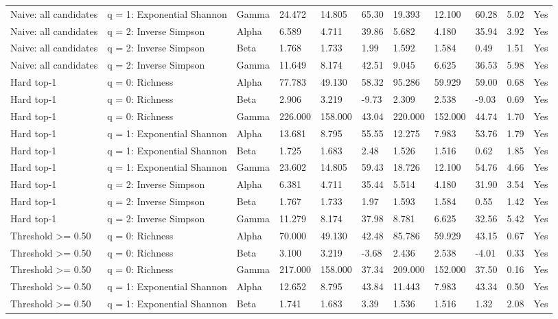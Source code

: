 \begin{landscape}
\begin{longtable}{L{3.0cm}L{2.4cm}L{1.5cm}*{6}{C{1.25cm}}C{1.65cm}C{1.35cm}}
Naive: all candidates & q = 1: Exponential Shannon & Gamma & 24.472 & 14.805 & 65.30 & 19.393 & 12.100 & 60.28 & 5.02 & Yes \\
Naive: all candidates & q = 2: Inverse Simpson & Alpha & 6.589 & 4.711 & 39.86 & 5.682 & 4.180 & 35.94 & 3.92 & Yes \\
Naive: all candidates & q = 2: Inverse Simpson & Beta & 1.768 & 1.733 & 1.99 & 1.592 & 1.584 & 0.49 & 1.51 & Yes \\
Naive: all candidates & q = 2: Inverse Simpson & Gamma & 11.649 & 8.174 & 42.51 & 9.045 & 6.625 & 36.53 & 5.98 & Yes \\
Hard top-1 & q = 0: Richness & Alpha & 77.783 & 49.130 & 58.32 & 95.286 & 59.929 & 59.00 & 0.68 & Yes \\
Hard top-1 & q = 0: Richness & Beta & 2.906 & 3.219 & -9.73 & 2.309 & 2.538 & -9.03 & 0.69 & Yes \\
Hard top-1 & q = 0: Richness & Gamma & 226.000 & 158.000 & 43.04 & 220.000 & 152.000 & 44.74 & 1.70 & Yes \\
Hard top-1 & q = 1: Exponential Shannon & Alpha & 13.681 & 8.795 & 55.55 & 12.275 & 7.983 & 53.76 & 1.79 & Yes \\
Hard top-1 & q = 1: Exponential Shannon & Beta & 1.725 & 1.683 & 2.48 & 1.526 & 1.516 & 0.62 & 1.85 & Yes \\
Hard top-1 & q = 1: Exponential Shannon & Gamma & 23.602 & 14.805 & 59.43 & 18.726 & 12.100 & 54.76 & 4.66 & Yes \\
Hard top-1 & q = 2: Inverse Simpson & Alpha & 6.381 & 4.711 & 35.44 & 5.514 & 4.180 & 31.90 & 3.54 & Yes \\
Hard top-1 & q = 2: Inverse Simpson & Beta & 1.767 & 1.733 & 1.97 & 1.593 & 1.584 & 0.55 & 1.42 & Yes \\
Hard top-1 & q = 2: Inverse Simpson & Gamma & 11.279 & 8.174 & 37.98 & 8.781 & 6.625 & 32.56 & 5.42 & Yes \\
Threshold >= 0.50 & q = 0: Richness & Alpha & 70.000 & 49.130 & 42.48 & 85.786 & 59.929 & 43.15 & 0.67 & Yes \\
Threshold >= 0.50 & q = 0: Richness & Beta & 3.100 & 3.219 & -3.68 & 2.436 & 2.538 & -4.01 & 0.33 & Yes \\
Threshold >= 0.50 & q = 0: Richness & Gamma & 217.000 & 158.000 & 37.34 & 209.000 & 152.000 & 37.50 & 0.16 & Yes \\
Threshold >= 0.50 & q = 1: Exponential Shannon & Alpha & 12.652 & 8.795 & 43.84 & 11.443 & 7.983 & 43.34 & 0.50 & Yes \\
Threshold >= 0.50 & q = 1: Exponential Shannon & Beta & 1.741 & 1.683 & 3.39 & 1.536 & 1.516 & 1.32 & 2.08 & Yes \\

\end{longtable}
\end{landscape}
